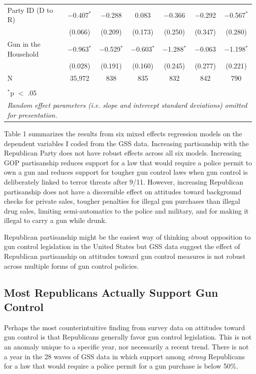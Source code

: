 \documentclass[11pt,]{article}
\begin{document}
\begin{table}[!htbp]
\begin{tabular}{@{\extracolsep{5pt}}lcccccc}
  Party ID (D to R) & $-$0.407$^{*}$ & $-$0.288 & 0.083 & $-$0.366 & $-$0.292 & $-$0.567$^{*}$ \\ 
  & (0.066) & (0.209) & (0.173) & (0.250) & (0.347) & (0.280) \\ 
  Gun in the Household & $-$0.963$^{*}$ & $-$0.529$^{*}$ & $-$0.603$^{*}$ & $-$1.288$^{*}$ & $-$0.063 & $-$1.198$^{*}$ \\ 
  & (0.028) & (0.191) & (0.160) & (0.245) & (0.277) & (0.221) \\ 
\hline 
 N & 35,972 & 838 & 835 & 832 & 842 & 790 \\ 
\hline \\[-1.8ex] 
\multicolumn{7}{l}{\scriptsize $^{*}$p $<$ .05} \\ 
\multicolumn{7}{l}{\scriptsize \emph{Random effect parameters (i.e. slope and intercept standard deviations) omitted for presentation.}} \\ 
\end{tabular} 
\end{table}

Table 1 summarizes the results from six mixed effects regression models
on the dependent variables I coded from the GSS data. Increasing
partisanship with the Republican Party does not have robust effects
across all six models. Increasing GOP partisanship reduces support for a
law that would require a police permit to own a gun and reduces support
for tougher gun control laws when gun control is deliberately linked to
terror threats after 9/11. However, increasing Republican partisanship
does not have a discernible effect on attitudes toward background checks
for private sales, tougher penalties for illegal gun purchases than
illegal drug sales, limiting semi-automatics to the police and military,
and for making it illegal to carry a gun while drunk.

Republican partisanship might be the easiest way of thinking about
opposition to gun control legislation in the United States but GSS data
suggest the effect of Republican partisanship on attitudes toward gun
control measures is not robust across multiple forms of gun control
policies.

\subsection{Most Republicans Actually Support Gun
Control}\label{most-republicans-actually-support-gun-control}

Perhaps the most counterintuitive finding from survey data on attitudes
toward gun control is that Republicans generally favor gun control
legislation. This is not an anomaly unique to a specific year, nor
necessarily a recent trend. There is not a year in the 28 waves of GSS
data in which support among \emph{strong} Republicans for a law that
would require a police permit for a gun purchase is below 50\%.
\end{document}
